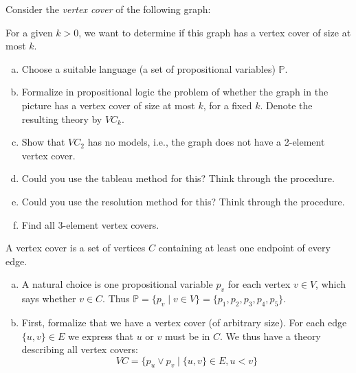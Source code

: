 \begin{problem}

    Consider the \emph{vertex cover} of the following graph:    
    \begin{center}
    \end{center}
    For a given $k>0$, we want to determine if this graph has a vertex cover of size at most $k$.

    \begin{enumerate}[(a)]
        \item Choose a suitable language (a set of propositional variables) $\mathbb P$.
        \item Formalize in propositional logic the problem of whether the graph in the picture has a vertex cover of size at most $k$, for a fixed $k$. Denote the resulting theory by ${VC}_k$.
        \item Show that ${VC}_2$ has no models, i.e., the graph does not have a 2-element vertex cover.
        \item Could you use the tableau method for this? Think through the procedure.
        \item Could you use the resolution method for this? Think through the procedure.
        \item Find all 3-element vertex covers.            
    \end{enumerate}

    \begin{solution}
        A vertex cover is a set of vertices $C$ containing at least one endpoint of every edge.
        \begin{enumerate}[(a)]
            \item A natural choice is one propositional variable $p_v$ for each vertex $v\in V$, which says whether $v\in C$. Thus $\mathbb P=\{p_v\mid v\in V\}=\{p_1,p_2,p_3,p_4,p_5\}$.
            \item First, formalize that we have a vertex cover (of arbitrary size). For each edge $\{u,v\}\in E$ we express that $u$ or $v$ must be in $C$. We thus have a theory describing all vertex covers:
            $$
            VC=\{p_u\lor p_v\mid \{u,v\}\in E, u<v\}
            $$
            

\end{enumerate}
\end{solution}
\end{problem}
